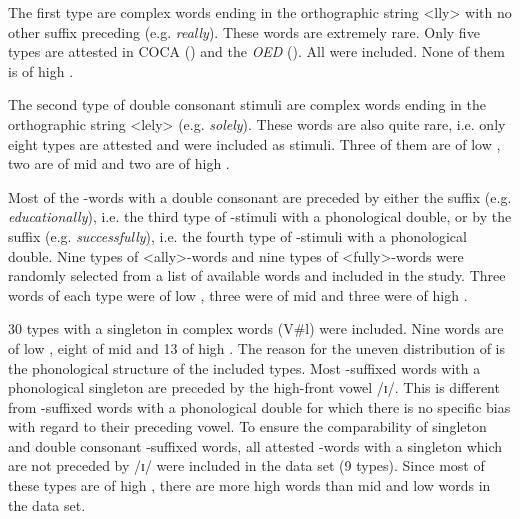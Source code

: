 The first type are complex words ending in the orthographic string <lly> with no other suffix preceding  (e.g. \textit{really}). These words are extremely rare. Only five types are attested  in  {COCA} (\citealt{Davies.20082014}) and the \textit{OED} (\citealt{OED.2013}). All were included. None of them is of high .

The second type of double consonant stimuli are complex words ending in the orthographic string <lely> (e.g. \textit{solely}). These words are also quite rare, i.e. only eight  types are attested and were included as stimuli. Three of them  are of low , two are of mid  and two are of high .



Most of the -words with a double consonant are preceded by either the suffix  (e.g. \textit{educationally}), i.e. the third type of -stimuli with a phonological double, or by the suffix  (e.g. \textit{successfully}), i.e. the fourth type of -stimuli with a phonological double. Nine types of <ally>-words and nine types of <fully>-words were randomly selected from a list of available words and included in the study. Three words of each type were of low , three were of mid  and three were of high .



30 types with a singleton in complex words (V\#l) were included. Nine words are of low , eight of mid  and 13 of high . The reason for the uneven distribution of  is the phonological structure of the included types. Most -suffixed words with a phonological singleton are preceded by the high-front vowel /ɪ/. This is different from -suffixed words with a phonological double for which there is no specific bias with regard to their preceding vowel. To ensure the comparability of singleton and double consonant -suffixed words, all attested -words with a singleton which are not preceded by /ɪ/ were included in the data set (9 types). Since most of these types are of high , there are more high  words than mid and low  words in the data set. %






